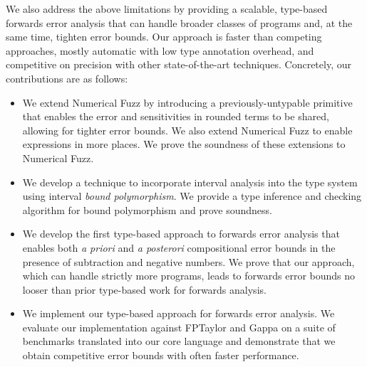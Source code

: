 We also address the above limitations by providing a scalable, type-based
forwards error analysis that can handle broader classes of programs and, at the
same time, tighten error bounds. Our approach is faster than competing
approaches, mostly automatic with low type annotation overhead, and competitive
on precision with other state-of-the-art techniques. Concretely, our
contributions are as follows:
\begin{itemize}
  \item We extend Numerical Fuzz by introducing a previously-untypable primitive
    that enables the error and sensitivities in rounded terms to be shared,
    allowing for tighter error bounds. We also extend Numerical Fuzz to enable
    expressions in more places. We prove the soundness of these extensions to
    Numerical Fuzz.

  \item We develop a technique to incorporate interval analysis into the type
    system using interval \textit{bound polymorphism}. We provide a type
    inference and checking algorithm for bound polymorphism and prove soundness.

  \item We develop the first type-based approach to forwards error analysis that
    enables both \textit{a priori} and \textit{a posterori} compositional error
    bounds in the presence of subtraction and negative numbers. We prove that
    our approach, which can handle strictly more programs, leads to forwards
    error bounds no looser than prior type-based work for forwards analysis.

  \item We implement our type-based approach for forwards error analysis. We
    evaluate our implementation against FPTaylor and Gappa on a suite of
    benchmarks translated into our core language and demonstrate that we obtain
    competitive error bounds with often faster performance.
\end{itemize}
